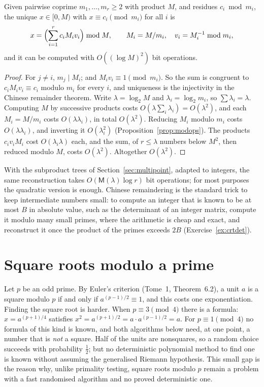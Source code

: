 \begin{proposition}\label{prop:crt}
Given pairwise coprime $m_1,\dots,m_r\ge2$ with product $M$, and residues $c_i\bmod m_i$, the unique $x\in[0,M)$ with $x\equiv c_i\pmod{m_i}$ for all $i$ is
\[
x=\Bigl(\sum_{i=1}^rc_iM_iv_i\Bigr)\bmod M,\qquad M_i=M/m_i,\quad v_i=M_i^{-1}\bmod m_i,
\]
and it can be computed with $O((\log M)^2)$ bit operations.
\end{proposition}
\begin{proof}
For $j\ne i$, $m_j\mid M_i$; and $M_iv_i\equiv1\pmod{m_i}$. So the sum is congruent to $c_iM_iv_i\equiv c_i$ modulo $m_i$ for every $i$, and uniqueness is the injectivity in the Chinese remainder theorem. Write $\lambda=\log_2M$ and $\lambda_i=\log_2m_i$, so $\sum\lambda_i=\lambda$. Computing $M$ by successive products costs $O(\lambda\sum_i\lambda_i)=O(\lambda^2)$, and each
$M_i=M/m_i$ costs $O(\lambda\lambda_i)$, in total $O(\lambda^2)$. Reducing $M_i$ modulo $m_i$ costs $O(\lambda\lambda_i)$, and inverting it $O(\lambda_i^2)$ (Proposition~\ref{prop:modops}). The products $c_iv_iM_i$ cost $O(\lambda_i\lambda)$ each, and the sum, of $r\le\lambda$ numbers below $M^2$, then reduced modulo $M$, costs $O(\lambda^2)$. Altogether $O(\lambda^2)$.
\end{proof}

With the subproduct trees of Section~\ref{sec:multipoint}, adapted to integers, the same reconstruction takes $O(\mathsf M(\lambda)\log r)$ bit operations; for most purposes the quadratic version is enough. Chinese remaindering is the standard trick to keep intermediate numbers small: to compute an integer that is known to be at most $B$ in absolute value,
such as the determinant of an integer matrix, compute it modulo many small primes, where the arithmetic is cheap and exact, and reconstruct it once the product of the primes exceeds $2B$ (Exercise~\ref{ex:crtdet}).

\section{Square roots modulo a prime}\label{sec:sqrtmodp}

Let $p$ be an odd prime. By Euler's criterion (Tome~1, Theorem~6.2), a unit $a$ is a square modulo $p$ if and only if $a^{(p-1)/2}\equiv1$, and this costs one exponentiation. Finding the square root is harder. When $p\equiv3\pmod4$ there is a formula: $x=a^{(p+1)/4}$ satisfies $x^2=a^{(p+1)/2}=a\cdot a^{(p-1)/2}=a$. For $p\equiv1\pmod4$ no formula of this kind is known, and
both algorithms below need, at one point, a number that is \emph{not} a square. Half of the units are nonsquares, so a random choice succeeds with probability $\frac12$; but no deterministic polynomial method to find one is known without assuming the generalised Riemann hypothesis. This small gap is the reason why, unlike primality testing, square roots modulo $p$
remain a problem with a fast randomised algorithm and no proved deterministic one.

